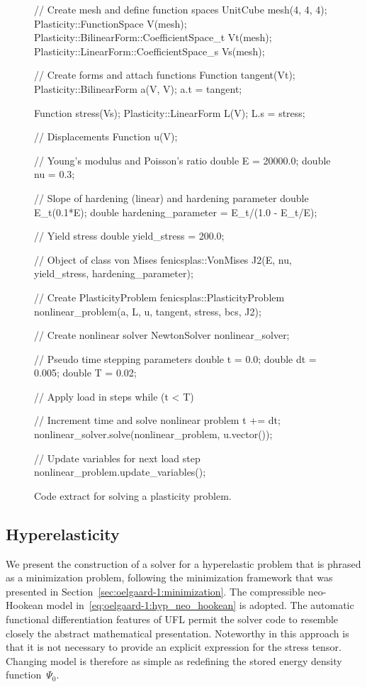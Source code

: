 \begin{figure}
\bwfig
\begin{c++}
// Create mesh and define function spaces
UnitCube mesh(4, 4, 4);
Plasticity::FunctionSpace V(mesh);
Plasticity::BilinearForm::CoefficientSpace_t Vt(mesh);
Plasticity::LinearForm::CoefficientSpace_s Vs(mesh);

// Create forms and attach functions
Function tangent(Vt);
Plasticity::BilinearForm a(V, V);
a.t = tangent;

Function stress(Vs);
Plasticity::LinearForm L(V);
L.s = stress;

// Displacements
Function u(V);

// Young's modulus and Poisson's ratio
double E = 20000.0; double nu = 0.3;

// Slope of hardening (linear) and hardening parameter
double E_t(0.1*E);
double hardening_parameter = E_t/(1.0 - E_t/E);

// Yield stress
double yield_stress = 200.0;

// Object of class von Mises
fenicsplas::VonMises J2(E, nu, yield_stress, hardening_parameter);

// Create PlasticityProblem
fenicsplas::PlasticityProblem nonlinear_problem(a, L, u, tangent, stress, bcs, J2);

// Create nonlinear solver
NewtonSolver nonlinear_solver;

// Pseudo time stepping parameters
double t = 0.0; double dt  = 0.005; double T = 0.02;

// Apply load in steps
while (t < T)
{
  // Increment time and solve nonlinear problem
  t += dt;
  nonlinear_solver.solve(nonlinear_problem, u.vector());

  // Update variables for next load step
  nonlinear_problem.update_variables();
}
\end{c++}
\caption{Code extract for solving a plasticity problem.}
\label{fig:oelgaard-1:plas_cpp_code}
\end{figure}

\subsection{Hyperelasticity}
\label{sec:oelgaard-1:examples_hyp_elas}

We present the construction of a solver for a hyperelastic problem that is
phrased as a minimization problem, following the minimization framework
that was presented in Section~\ref{sec:oelgaard-1:minimization}. The
compressible neo-Hookean model in~\eqref{eq:oelgaard-1:hyp_neo_hookean}
is adopted.  The automatic functional differentiation features of UFL
permit the solver code to resemble closely the abstract mathematical
presentation. Noteworthy in this approach is that it is not necessary to
provide an explicit expression for the stress tensor.  Changing model is
therefore as simple as redefining the stored energy density function~$\Psi_{0}$.


